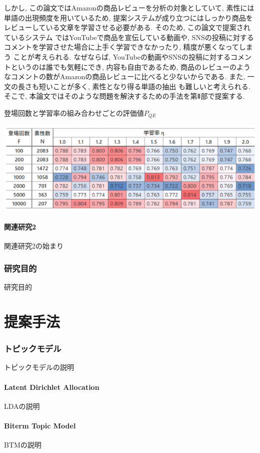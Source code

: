 \documentclass{ltjarticle}
\begin{document}
しかし, この論文ではAmazonの商品レビューを分析の対象としていて, 素性には単語の出現頻度を用いているため, 
提案システムが成り立つにはしっかり商品をレビューしている文章を学習させる必要がある. そのため, この論文で提案されているシステム
ではYouTubeで商品を宣伝している動画や, SNSの投稿に対するコメントを学習させた場合に上手く学習できなかったり, 精度が悪くなってしまう
ことが考えられる. なぜならば, YouTubeの動画やSNSの投稿に対するコメントというのは誰でも気軽にでき, 内容も自由であるため, 
商品のレビューのようなコメントの数がAmazonの商品レビューに比べると少ないからである. また, 一文の長さも短いことが多く, 素性となり得る単語の抽出
も難しいと考えられる. そこで, 本論文ではそのような問題を解決するための手法を第Ⅱ部で提案する.
\begin{table}
    \centering
    \caption{登場回数と学習率の組み合わせごとの評価値$P_{QE}$}
    \includegraphics[width=14cm]{table1.png}
\end{table}

\subsection{関連研究2}
関連研究2の始まり

\section{研究目的}
研究目的

\newpage
\part{提案手法}
\section{トピックモデル}
トピックモデルの説明
\subsection{Latent Dirichlet Allocation}
LDAの説明
\subsection{Biterm Topic Model}
BTMの説明
\end{document}
